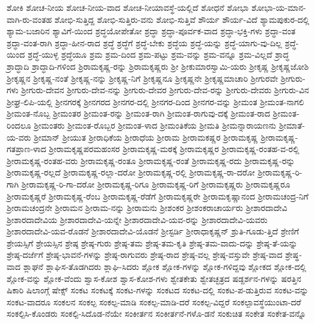 {ಶೋಕಿ
ಶೋಚ-ನೀಯ
ಶೋಚ-ನೀಯ-ವಾದ
ಶೋಚ-ನೀಯಾವಸ್ಥೆ-ಯಲ್ಲಿದೆ
ಶೋಧನೆ
ಶೋಭಾ
ಶೋಭಾ-ಯ-ಮಾನ-ವಾಗಿ-ರು-ವಂತಹ
ಶೋಭಿ-ಸುತ್ತಿದ್ದ
ಶೋಭಿ-ಸುತ್ತಿರು-ವನು
ಶೋಭಿ-ಸುತ್ತಿವೆ
ಶೌರ್ಯ
ಶೌರ್ಯ-ವಿದೆ
ಶ್ಯಾಮಪುಕುರ-ದಲ್ಲಿ
ಶ್ಯಾಮ-ಬಜಾರಿನ
ಶ್ಯಾವಿಗೆ-ಯಿಂದ
ಶ್ರದ್ಧಯೋಪೇತೋ
ಶ್ರದ್ಧಾ
ಶ್ರದ್ಧಾ-ಪೂರ್ವಕ-ವಾದ
ಶ್ರದ್ಧಾ-ಭಕ್ತಿ-ಗಳು
ಶ್ರದ್ಧಾ-ವಂತ
ಶ್ರದ್ಧಾ-ವಂತ-ರಾಗಿ
ಶ್ರದ್ಧಾ-ಹೀನ-ರಾದ
ಶ್ರದ್ಧೆ
ಶ್ರದ್ಧೆಗೆ
ಶ್ರದ್ಧೆ-ಬೇಕು
ಶ್ರದ್ಧೆಯ
ಶ್ರದ್ಧೆ-ಯನ್ನು
ಶ್ರದ್ಧೆ-ಯಾಗು-ವು-ದಿಲ್ಲ
ಶ್ರದ್ಧೆ-ಯಿಂದ
ಶ್ರದ್ಧೆ-ಯುಳ್ಳ
ಶ್ರದ್ಧೆಯೂ
ಶ್ರಮ
ಶ್ರಮ-ದಿಂದ
ಶ್ರಮ-ಪಟ್ಟು
ಶ್ರಮ-ವನ್ನು
ಶ್ರಮ-ವನ್ನೂ
ಶ್ರಮ-ವಿಲ್ಲದೆ
ಶ್ರಾದ್ಧ
ಶ್ರಾದ್ಧಾದಿ
ಶ್ರಾದ್ಧಾದಿ-ಗಳಿಂದ
ಶ್ರಿರಾಮಕೃಷ್ಣ-ರನ್ನು
ಶ್ರಿರಾಮಕೃಷ್ಣರು
ಶ್ರೀ
ಶ್ರೀಕುಮಾರಸ್ವಾಮಿ-ಯರು
ಶ್ರೀಕೃಷ್ಣ
ಶ್ರೀಕೃಷ್ಣಜೋಶಿ
ಶ್ರೀಕೃಷ್ಣನ
ಶ್ರೀಕೃಷ್ಣ-ನಂತೆ
ಶ್ರೀಕೃಷ್ಣ-ನನ್ನು
ಶ್ರೀಕೃಷ್ಣ-ನಿಗೆ
ಶ್ರೀಕೃಷ್ಣನೂ
ಶ್ರೀಕೃಷ್ಣನೇ
ಶ್ರೀಕೃಷ್ಣಮಾಚಾರಿ
ಶ್ರೀಗುರವೇ
ಶ್ರೀಗುರು-ಗಳು
ಶ್ರೀಗುರು-ದೇವನ
ಶ್ರೀಗುರು-ದೇವ-ನನ್ನು
ಶ್ರೀಗುರು-ದೇವರ
ಶ್ರೀಗುರು-ದೇವ-ರನ್ನು
ಶ್ರೀಗುರು-ದೇವರು
ಶ್ರೀಗುರು-ವಿನ
ಶ್ರೀಘ್ರ-ಲಿಪಿ-ಯಲ್ಲಿ
ಶ್ರೀನಗರಕ್ಕೆ
ಶ್ರೀನಗರದ
ಶ್ರೀನಗರ-ದಲ್ಲಿ
ಶ್ರೀನಗರ-ದಿಂದ
ಶ್ರೀನಗರ-ವನ್ನು
ಶ್ರೀಮಂತ
ಶ್ರೀಮಂತ-ನಾಗಲಿ
ಶ್ರೀಮಂತ-ನೊಬ್ಬ
ಶ್ರೀಮಂತರ
ಶ್ರೀಮಂತ-ರನ್ನು
ಶ್ರೀಮಂತ-ರಾಗಿ
ಶ್ರೀಮಂತ-ರಾಗುವು-ದಕ್ಕೆ
ಶ್ರೀಮಂತ-ರಾದ
ಶ್ರೀಮಂತ-ರಿಂದಲೂ
ಶ್ರೀಮಂತರು
ಶ್ರೀಮಂತ-ರೊಬ್ಬರ
ಶ್ರೀಮಂತ-ಳಾದ
ಶ್ರೀಮಂತಿಕೆಯ
ಶ್ರೀಮತಿ
ಶ್ರೀಮನ್ನಾರಾಯಣನು
ಶ್ರೀಮಾತೆ-ಯ-ವರು
ಶ್ರೀಮಾನ್
ಶ್ರೀಯುತ
ಶ್ರೀರಾಧಿಕೆಯ
ಶ್ರೀರಾಧೆಯ
ಶ್ರೀರಾಮ
ಶ್ರೀರಾಮಕಷ್ಣರ
ಶ್ರೀರಾಮಕೃಷ್ಣ
ಶ್ರೀರಾಮಕೃಷ್ಣ-ಗತಪ್ರಾಣ-ಳಾದ
ಶ್ರೀರಾಮಕೃಷ್ಣಪರಮಹಂಸರ
ಶ್ರೀರಾಮಕೃಷ್ಣ-ಮಠಕ್ಕೆ
ಶ್ರೀರಾಮಕೃಷ್ಣರ
ಶ್ರೀರಾಮಕೃಷ್ಣ-ರಂತಹ-ವ-ರಲ್ಲಿ
ಶ್ರೀರಾಮಕೃಷ್ಣ-ರಂತಹ-ವರು
ಶ್ರೀರಾಮಕೃಷ್ಣ-ರಂತೂ
ಶ್ರೀರಾಮಕೃಷ್ಣ-ರಂತೆ
ಶ್ರೀರಾಮಕೃಷ್ಣ-ರದು
ಶ್ರೀರಾಮಕೃಷ್ಣ-ರನ್ನು
ಶ್ರೀರಾಮಕೃಷ್ಣ-ರಲ್ಲದೆ
ಶ್ರೀರಾಮಕೃಷ್ಣ-ರಲ್ಲಾ-ದರೋ
ಶ್ರೀರಾಮಕೃಷ್ಣ-ರಲ್ಲಿ
ಶ್ರೀರಾಮಕೃಷ್ಣ-ರಾ-ದರೋ
ಶ್ರೀರಾಮಕೃಷ್ಣ-ರಿ-ಗಾಗಿ
ಶ್ರೀರಾಮಕೃಷ್ಣ-ರಿ-ಗಾ-ದರೋ
ಶ್ರೀರಾಮಕೃಷ್ಣ-ರಿಗೂ
ಶ್ರೀರಾಮಕೃಷ್ಣ-ರಿಗೆ
ಶ್ರೀರಾಮಕೃಷ್ಣರು
ಶ್ರೀರಾಮಕೃಷ್ಣರೂ
ಶ್ರೀರಾಮಕೃಷ್ಣರೆ
ಶ್ರೀರಾಮಕೃಷ್ಣ-ರೆಂಬ
ಶ್ರೀರಾಮಕೃಷ್ಣ-ರೆಡೆಗೆ
ಶ್ರೀರಾಮಕೃಷ್ಣರೇ
ಶ್ರೀರಾಮಕೃಷ್ಣಾನಂದ
ಶ್ರೀರಾಮಚಂದ್ರ-ನಿಗೆ
ಶ್ರೀರಾಮಚಂದ್ರನೇ
ಶ್ರೀರಾಮನ
ಶ್ರೀರಾಮ-ನನ್ನು
ಶ್ರೀರಾಮನು
ಶ್ರೀಶಂಕರ
ಶ್ರೀಶಂಕರಾಚಾರ್ಯರು
ಶ್ರೀಶಾರದಾದೇವಿ
ಶ್ರೀಶಾರದಾದೇವಿಯ
ಶ್ರೀಶಾರದಾದೇವಿ-ಯನ್ನೇ
ಶ್ರೀಶಾರದಾದೇವಿ-ಯವ-ರನ್ನು
ಶ್ರೀಶಾರದಾದೇವಿ-ಯವರು
ಶ್ರೀಶಾರದಾದೇವಿ-ಯವ-ರೊಡನೆ
ಶ್ರೀಶಾರದಾದೇವಿ-ಯೊಡನೆ
ಶ್ರೀಸ್ಟರ್ಡಿ
ಶ್ರೀರಾಧಾಕೃಷ್ಣನ್
ಶ್ರುತಿ-ಗೂಡು-ತ್ತಿದೆ
ಶ್ರೇಣಿಗೆ
ಶ್ರೇಯಸ್ಸಿಗೆ
ಶ್ರೇಯಸ್ಸಿನ
ಶ್ರೇಷ್ಠ
ಶ್ರೇಷ್ಠ-ಗುರು
ಶ್ರೇಷ್ಠ-ತಮ
ಶ್ರೇಷ್ಠ-ತಮ-ಕೃತಿ
ಶ್ರೇಷ್ಠ-ತಮ-ವಾದು-ದನ್ನು
ಶ್ರೇಷ್ಠ-ತೆ-ಯನ್ನು
ಶ್ರೇಷ್ಠ-ದರ್ಜೆಗೆ
ಶ್ರೇಷ್ಠ-ಭಾವನೆ-ಗಳನ್ನು
ಶ್ರೇಷ್ಠ-ರಾಗುವರು
ಶ್ರೇಷ್ಠ-ರಾದ
ಶ್ರೇಷ್ಠ-ವಲ್ಲ
ಶ್ರೇಷ್ಠ-ವಸ್ತುವೇ
ಶ್ರೇಷ್ಠ-ವಾದ
ಶ್ರೇಷ್ಥ-ವಾದ
ಶ್ಲಾಘನೆ
ಶ್ಲಾಘಿಸ-ತೊಡಗಿದರು
ಶ್ಲಾಘಿ-ಸಿದರು
ಶ್ಲೋಕ
ಶ್ಲೋಕ-ಗಳನ್ನು
ಶ್ಲೋಕ-ಗಳಿದ್ದವು
ಶ್ಲೋಕದ
ಶ್ಲೋಕ-ದಲ್ಲಿ
ಶ್ಲೋಕ-ವನ್ನು
ಶ್ಲೋಕ-ವೆಂದು
ಶ್ವಾಸ-ಕೋಶ
ಶ್ವಾಸ-ಕೋಶ-ಗಳು
ಶ್ವೇತಕೇತು
ಶ್ವೇತಚ್ಛತ್ರದ
ಷಡ್ದರ್ಶನ-ಗಳನ್ನು
ಷರತ್ತಿನ
ಷಿಕಾರಿ
ಷಿಲಾಂಗ್ಗೆ
ಷೇಕ್ಸ್
ಸಂಕಟ
ಸಂಕಟಕ್ಕೆ
ಸಂಕಟ-ಗಳನ್ನು
ಸಂಕಟದ
ಸಂಕಟ-ದಲ್ಲಿ
ಸಂಕಟ-ಪ-ಡುತ್ತಿರುವ
ಸಂಕಟ-ವನ್ನು
ಸಂಕಟ-ವಾದರೂ
ಸಂಕಲನ
ಸಂಕಲ್ಪ
ಸಂಕಲ್ಪ-ಮಾಡಿ
ಸಂಕಲ್ಪ-ಮಾಡಿ-ದರೆ
ಸಂಕಲ್ಪ-ವಿದ್ದರೆ
ಸಂಕಲ್ಪಾವಸ್ಥೆಯುಂಟಾ-ದರೆ
ಸಂಕಲ್ಪಿಸಿ-ಕೊಂಡರು
ಸಂಕಲ್ಪಿ-ಸಿದೊಡ-ನೆಯೇ
ಸಂಕೀರ್ತನ
ಸಂಕೀರ್ತನೆ-ಗಳೊ-ಡನೆ
ಸಂಕುಚಿತ
ಸಂಕೇತ
ಸಂಕೇತ-ವನ್ನೊ
}
